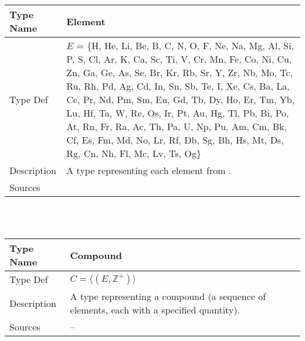 \documentclass[12pt]{article}
\newcommand{\colAwidth}{0.13\textwidth}
\newcommand{\colBwidth}{0.82\textwidth}
\begin{document}
\noindent
\begin{minipage}{\textwidth}
  \renewcommand*{\arraystretch}{1.5}
  \begin{tabular}{| p{\colAwidth} | p{\colBwidth}|}
    \hline
    \rowcolor[gray]{0.9}
    Type Name   & Element                                                   \\
    \hline
    Type Def    & $E$ = \{H, He, Li, Be, B, C, N, O, F, Ne, Na, Mg, Al, Si,
    P, S, Cl, Ar, K, Ca, Sc, Ti, V, Cr, Mn, Fe, Co, Ni, Cu, Zn, Ga, Ge, As, Se,
    Br, Kr, Rb, Sr, Y, Zr, Nb, Mo, Tc, Ru, Rh, Pd, Ag, Cd, In, Sn, Sb, Te, I,
    Xe, Cs, Ba, La, Ce, Pr, Nd, Pm, Sm, Eu, Gd, Tb, Dy, Ho, Er, Tm, Yb, Lu, Hf,
    Ta, W, Re, Os, Ir, Pt, Au, Hg, Tl, Pb, Bi, Po, At, Rn, Fr, Ra, Ac, Th, Pa,
    U, Np, Pu, Am, Cm, Bk, Cf, Es, Fm, Md, No, Lr, Rf, Db, Sg, Bh, Hs, Mt, Ds,
    Rg, Cn, Nh, Fl, Mc, Lv, Ts, Og\}                                        \\

    \hline
    Description & A type representing each element from
    \cite{wikipedia_list_2023}.                                             \\
    \hline
    Sources     & \cite{smith_assignment_2020}                              \\
    \hline
  \end{tabular}
\end{minipage}\\
~\newline

\noindent
\begin{minipage}{\textwidth}
  \renewcommand*{\arraystretch}{1.5}
  \begin{tabular}{| p{\colAwidth} | p{\colBwidth}|}
    \hline
    \rowcolor[gray]{0.9}
    Type Name   & Compound                                                     \\
    \hline
    Type Def    & $C = \langle (E, \mathbb{Z}^+) \rangle$                      \\

    \hline
    Description & A type representing a compound (a sequence of elements, each
    with a specified quantity).                                                \\
    \hline
    Sources     & --                                                           \\
    \hline
  \end{tabular}
\end{minipage}\\
\end{document}

